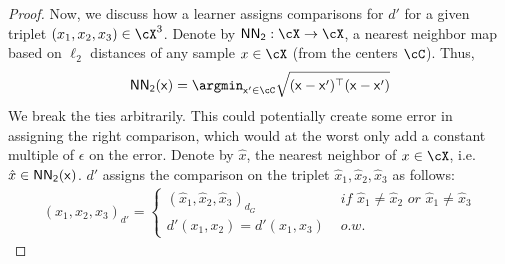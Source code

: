 \begin{proof}
    Now, we discuss how a learner assigns comparisons for $d'$ for a given triplet $(x_1,x_2,x_3) \in \cX^3$. Denote by $\sf{NN}_2: \cX \to \cX$, a nearest neighbor map based on $\ell_2$ distances of any sample $x \in \cX$ (from the centers $\cC$). Thus, 
    \begin{align*}
        \sf{NN}_2(x) = \argmin_{x' \in \cC} \sqrt{(x-x')^{\top}(x-x')}
    \end{align*}
    We break the ties arbitrarily. This could potentially create some error in assigning the right comparison, which would at the worst only add a constant multiple of $\epsilon$ on the error. Denote by $\hat{x}$, the nearest neighbor of $x \in \cX$, i.e.  $\hat{x} \in \sf{NN}_2(x)$.
    $d'$ assigns the comparison on the triplet $\hat{x}_1, \hat{x}_2,\hat{x}_3$ as follows:
    \begin{align}\label{eq: approxmetric}
        (x_1,x_2,x_3)_{d'} = \begin{cases}
            (\hat{x}_1,\hat{x}_2,\hat{x}_3)_{d_G} & \textit{ if } 
            \hat{x}_1 \neq \hat{x}_2 \textit{ or } \hat{x}_1 \neq \hat{x}_3\\
            d'(x_1,x_2) = d'(x_1,x_3)  & \textit{ o.w. }   %
        \end{cases}
    \end{align}
    

\end{proof}
